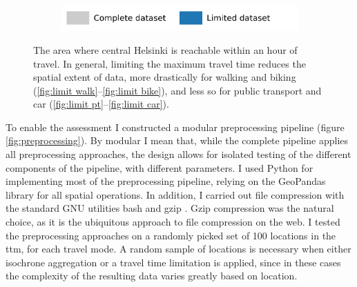 \begin{figure}[H]
	\hfill
	\begin{subfigure}[b]{0.55\textwidth}
		\includegraphics[width=\textwidth]{visual/figures/ttm/tt_limit_legend}
	\end{subfigure}%
	\caption{
		The area where central Helsinki is reachable within an hour of travel.
		In general, limiting the maximum travel time reduces the spatial extent of data,
		more drastically for walking and biking (\ref{fig:limit walk}--\ref{fig:limit bike}),
		and less so for public transport and car (\ref{fig:limit pt}--\ref{fig:limit car}).
	}
	\label{fig:tt limits}
\end{figure}

To enable the assessment
I constructed a modular preprocessing pipeline
(figure \ref{fig:preprocessing}).
By modular I mean that,
while the complete pipeline applies all preprocessing approaches,
the design allows for isolated testing of the
different components of the pipeline, with different parameters.
I used Python \parencite{python} for implementing most of the preprocessing pipeline,
relying on the GeoPandas \parencite{jor2024} library for all spatial operations.
In addition, I carried out file compression with
the standard GNU utilities bash \parencite{bash} and gzip \parencite{gzip}.
Gzip compression was the natural choice,
as it is the ubiquitous approach to file compression on the web. 
I tested the preprocessing approaches on
a randomly picked set of 100 locations in the \acrshort{ttm},
for each travel mode.
A random sample of locations is necessary when either
isochrone aggregation or a travel time limitation is applied,
since in these cases the complexity of the resulting
data varies greatly based on location.

